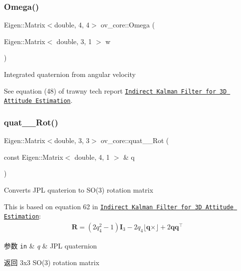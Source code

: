 \subsubsection{\texorpdfstring{Omega()}{Omega()}}
{\footnotesize\ttfamily Eigen\+::\+Matrix$<$double, 4, 4$>$ ov\+\_\+core\+::\+Omega (\begin{DoxyParamCaption}\item[{Eigen\+::\+Matrix$<$ double, 3, 1 $>$}]{w }\end{DoxyParamCaption})\hspace{0.3cm}{\ttfamily [inline]}}



Integrated quaternion from angular velocity 

See equation (48) of trawny tech report \href{http://mars.cs.umn.edu/tr/reports/Trawny05b.pdf}{\tt Indirect Kalman Filter for 3D Attitude Estimation}. \mbox{\label{namespaceov__core_adfb06397034cc6b346efb9517ed3757e}} 
\subsubsection{\texorpdfstring{quat\+\_\+\_\+\+Rot()}{quat\_2\_Rot()}}
{\footnotesize\ttfamily Eigen\+::\+Matrix$<$double, 3, 3$>$ ov\+\_\+core\+::quat\+\_\+\_\+\+Rot (\begin{DoxyParamCaption}\item[{const Eigen\+::\+Matrix$<$ double, 4, 1 $>$ \&}]{q }\end{DoxyParamCaption})\hspace{0.3cm}{\ttfamily [inline]}}



Converts J\+PL quaterion to S\+O(3) rotation matrix 

This is based on equation 62 in \href{http://mars.cs.umn.edu/tr/reports/Trawny05b.pdf}{\tt Indirect Kalman Filter for 3D Attitude Estimation}\+: \begin{align*} \mathbf{R} = (2q_4^2-1)\mathbf{I}_3-2q_4\lfloor\mathbf{q}\times\rfloor+2\mathbf{q}\mathbf{q}^\top \end{align*}


\begin{DoxyParams}[1]{参数}
\mbox{\tt in}  & {\em q} & J\+PL quaternion \\
\hline
\end{DoxyParams}
\begin{DoxyReturn}{返回}
3x3 S\+O(3) rotation matrix 
\end{DoxyReturn}
\mbox{\label{namespaceov__core_aa708e95617ccac1c880451014f2715fa}} 
